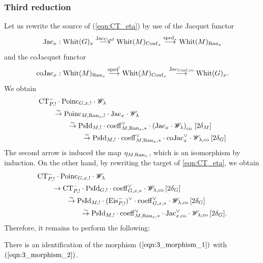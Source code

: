 \subsubsection{Third reduction} Let us rewrite the source of (\ref{eqn:CT_eta}) by use of the Jacquet functor
    \[
    \mathrm{Jac}_x : \mathrm{Whit}(G)_x \overset{\mathrm{Jac}_{\mathrm{Conf}}}{\longrightarrow} \mathrm{Whit}(M)_{\mathrm{Conf}_x} \overset{\mathrm{sprd}_*}{\longrightarrow} \mathrm{Whit}(M)_{\mathrm{Ran}_x}
    \]
and the coJacquet functor
    \[
    \mathrm{co}\mathrm{Jac}_x : \mathrm{Whit}(M)_{\mathrm{Ran}_x} \overset{\mathrm{sprd}^!}{\longrightarrow} \mathrm{Whit}(M)_{\mathrm{Conf}_x} \overset{\mathrm{Jac}_{\mathrm{Conf},\mathrm{co}}}{\longrightarrow} \mathrm{Whit}(G)_x.
    \]
We obtain
\begin{equation}
\label{eqn:3_morphism_1}
\begin{split}
    & \mathrm{CT}_{P,!}^- \cdot \mathrm{Poinc}_{G,x,!} \cdot \mathscr{W}_\lambda  \\
    & \qquad\overset{\sim}{\rightarrow} \mathrm{Poinc}_{M,\mathrm{Ran}_x,!} \cdot \mathrm{Jac}_x \cdot \mathscr{W}_\lambda \\
    & \qquad\qquad \overset{\sim}{\rightarrow} \mathrm{PsId}_{M,!} \cdot \mathrm{coeff}_{M,\mathrm{Ran}_x,*}^\vee \cdot \left(\mathrm{Jac}_x \cdot \mathscr{W}_\lambda \right)_{\mathrm{co}} \, [2\delta_M]\\
    & \qquad\qquad\qquad \overset{\sim}{\rightarrow} \mathrm{PsId}_{M,!} \cdot \mathrm{coeff}_{M,\mathrm{Ran}_x,*}^\vee \cdot \mathrm{co}\mathrm{Jac}_x^\vee \cdot \mathscr{W}_{\lambda, \mathrm{co}} \, [2\delta_G]
\end{split}
\end{equation}
The second arrow is induced the map $\eta_{M,\mathrm{Ran}_x}$, which is an isomorphism by induction. On the other hand, by rewriting the target of \ref{eqn:CT_eta}, we obtain
\begin{equation}
\label{eqn:3_morphism_2}
\begin{split}
    & \mathrm{CT}_{P,!}^- \cdot \mathrm{Poinc}_{G,x,!} \cdot \mathscr{W}_\lambda \\
    & \qquad \to \mathrm{CT}_{P,!}^- \cdot \mathrm{PsId}_{G,!} \cdot \mathrm{coeff}_{G,x,*}^\vee \cdot \mathscr{W}_{\lambda, \mathrm{co}} \, [2\delta_G] \\
    & \qquad\qquad \overset{\sim}{\rightarrow} \mathrm{PsId}_{M,!} \cdot (\mathrm{Eis}_{P,!}^-)^\vee \cdot \mathrm{coeff}_{G,x,*}^\vee \cdot \mathscr{W}_{\lambda, \mathrm{co}} \, [2\delta_G]\\
    & \qquad\qquad\qquad \overset{\sim}{\rightarrow} \mathrm{PsId}_{M,!} \cdot \mathrm{coeff}_{M,\mathrm{Ran}_x, *}^\vee \cdot \mathrm{Jac}_{x,\mathrm{co}}^\vee \cdot \mathscr{W}_{\lambda, \mathrm{co}} \, [2\delta_G].
\end{split}
\end{equation}
Therefore, it remains to perform the following:

\begin{construction}
\label{construction:3_morphism}
There is an identification of the morphism $(\ref{eqn:3_morphism_1})$ with $(\ref{eqn:3_morphism_2})$.
\end{construction}

